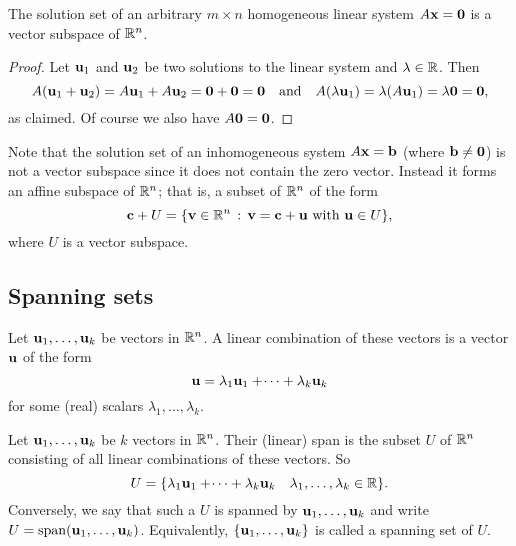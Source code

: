 \documentclass[10pt, a4paper]{article}
\begin{document}
\begin{proposition}
    The solution set of an arbitrary $m \times n$ homogeneous linear system $A\mathbf{x} = \mathbf{0}$ is a vector subspace of $\mathbb{R} ^ n$.
    \begin{proof}
        Let $\mathbf{u}_1$ and $\mathbf{u}_2$ be two solutions to the linear system and $\lambda \in \mathbb{R}$.
        Then
        \[
        A(\mathbf{u}_1 + \mathbf{u}_2) = A\mathbf{u}_1 + A\mathbf{u}_2 = \mathbf{0} + \mathbf{0} = \mathbf{0}\quad\text{and}\quad A(\lambda\mathbf{u}_1) = \lambda(A\mathbf{u}_1) = \lambda\mathbf{0} = \mathbf{0},
        \]
        as claimed.
        Of course we also have $A\mathbf{0} = \mathbf{0}$.
    \end{proof}
\end{proposition}

Note that the solution set of an inhomogeneous system $A\mathbf{x} = \mathbf{b}$
(where $\mathbf{b} \neq \mathbf{0}$)
is not a vector subspace since it does not contain the zero vector.
Instead it forms an affine subspace of $\mathbb{R} ^ n$;
that is,
a subset of $\mathbb{R} ^ n$ of the form
\[
\mathbf{c} + U = \{\mathbf{v} \in \mathbb{R} ^ n\,:\,\mathbf{v} = \mathbf{c} + \mathbf{u}\text{ with }\mathbf{u} \in U\},
\]
where $U$ is a vector subspace.
\begin{center}
\end{center}
\hfill

\subsection{Spanning sets}
Let $\mathbf{u}_1, \dotsc, \mathbf{u}_k$ be vectors in $\mathbb{R} ^ n$.
A linear combination of these vectors is a vector $\mathbf{u}$ of the form
\[
\mathbf{u} = \lambda_1\mathbf{u}_1 + \dotsi + \lambda_k\mathbf{u}_k
\]
for some (real) scalars $\lambda_1, \dotsc, \lambda_k$.

\begin{definition}
    Let $\mathbf{u}_1, \dotsc, \mathbf{u}_k$ be $k$ vectors in $\mathbb{R} ^ n$.
    Their (linear) span is the subset $U$ of $\mathbb{R} ^ n$ consisting of all linear combinations of these vectors.
    So
    \[
    U = \{\lambda_1\mathbf{u}_1 + \dotsi + \lambda_k\mathbf{u}_k\quad\lambda_1, \dotsc, \lambda_k \in \mathbb{R}\}.
    \]
    Conversely,
    we say that such a $U$ is spanned by $\mathbf{u}_1, \dotsc, \mathbf{u}_k$ and write $U = \mathrm{span}(\mathbf{u}_1, \dotsc, \mathbf{u}_k)$.
    Equivalently,
    $\{\mathbf{u}_1, \dotsc, \mathbf{u}_k\}$ is called a spanning set of $U$.
\end{definition}
\end{document}

